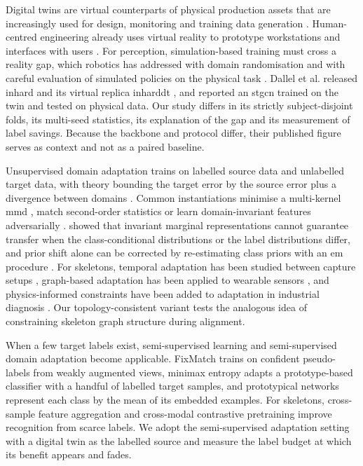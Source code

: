 \documentclass[]{interact}
\begin{document}
Digital twins are virtual counterparts of physical production assets that are
increasingly used for design, monitoring and training data
generation \citep{tao2019digitaltwin}. Human-centred engineering already uses
virtual reality to prototype workstations and interfaces with
users \citep{valentini2025digital}. For perception, simulation-based training
must cross a reality gap, which robotics has addressed with domain
randomisation \citep{tobin2017domainrandomization} and with careful evaluation
of simulated policies on the physical task \citep{rothert2024simtoreal}. Dallel
et al. released \ac{inhard} \citep{dallel2020inhardpaper,dallel2020inhard} and
its virtual replica \ac{inharddt} \citep{dallel2023digital,dallel2023dataset},
and reported an \ac{stgcn} trained on the twin and tested on physical data.
Our study differs in its strictly subject-disjoint folds, its multi-seed
statistics, its explanation of the gap and its measurement of label savings.
Because the backbone and protocol differ, their published figure serves as
context and not as a paired baseline.

Unsupervised domain adaptation trains on labelled source data and unlabelled
target data, with theory bounding the target error by the source error plus a
divergence between domains \citep{bendavid2010theory}. Common instantiations
minimise a multi-kernel \ac{mmd} \citep{long2015dan}, match second-order
statistics \citep{sun2016deepcoral} or learn domain-invariant features
adversarially \citep{ganin2016dann}. \citet{zhao2019invariant} showed
that invariant marginal representations cannot guarantee transfer when the
class-conditional distributions or the label distributions differ, and prior
shift alone can be corrected by re-estimating class priors with an
\ac{em} procedure \citep{saerens2002priors}. For skeletons, temporal
adaptation has been studied between capture setups \citep{tian2024temporaladaptation},
graph-based adaptation has been applied to wearable sensors \citep{yang2024domainhar},
and physics-informed constraints have been added to adaptation in industrial
diagnosis \citep{he2024physicsinformed}. Our topology-consistent variant tests
the analogous idea of constraining skeleton graph structure during alignment.

When a few target labels exist, semi-supervised learning and semi-supervised
domain adaptation become applicable. FixMatch \citep{sohn2020fixmatch} trains on
confident pseudo-labels from weakly augmented views, minimax
entropy \citep{saito2019mme} adapts a prototype-based classifier with a handful
of labelled target samples, and prototypical networks \citep{snell2017prototypical}
represent each class by the mean of its embedded examples. For skeletons,
cross-sample feature aggregation \citep{zhang2025skeletonx} and cross-modal
contrastive pretraining \citep{lu2024crossmodalfewshot} improve recognition from
scarce labels. We adopt the semi-supervised adaptation setting with a digital
twin as the labelled source and measure the label budget at which its benefit
appears and fades.
\end{document}
